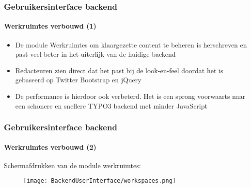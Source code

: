 \begin{frame}[fragile]
	\frametitle{Gebruikersinterface backend}
	\framesubtitle{Werkruimtes verbouwd (1)}

	\begin{itemize}

		\item De module Werkruimtes om klaargezette content te beheren is herschreven
		 	en past veel beter in het uiterlijk van de huidige backend

		\item Redacteuren zien direct dat het past bij de look-en-feel doordat het
		 	is gebaseerd op Twitter Bootstrap en jQuery

		\item De performance is hierdoor ook verbeterd. Het is een sprong voorwaarts
		 	naar een schonere en snellere TYPO3 backend met minder JavaScript

	\end{itemize}

\end{frame}

\begin{frame}[fragile]
	\frametitle{Gebruikersinterface backend}
	\framesubtitle{Werkruimtes verbouwd (2)}

	Schermafdrukken van de module werkruimtes:

	\begin{figure}
		\texttt{[image: BackendUserInterface/workspaces.png]}
	\end{figure}

\end{frame}

